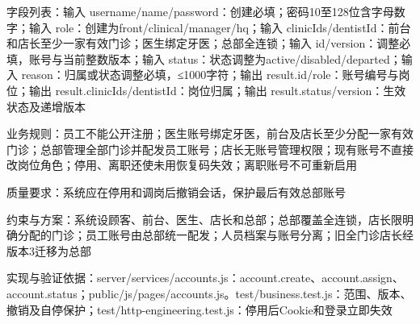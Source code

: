 \documentclass[UTF8,12pt,a4paper,fontset=none]{ctexart}
\begin{document}
字段列表：输入 username/\allowbreak{}name/\allowbreak{}password：创建必填；密码10至128位含字母数字；输入 role：创建为front/\allowbreak{}clinical/\allowbreak{}manager/\allowbreak{}hq；输入 clinicIds/\allowbreak{}dentistId：前台和店长至少一家有效门诊；医生绑定牙医；总部全连锁；输入 id/\allowbreak{}version：调整必填，账号与当前整数版本；输入 status：状态调整为active/\allowbreak{}disabled/\allowbreak{}departed；输入 reason：归属或状态调整必填，≤1000字符；输出 result.\allowbreak{}id/\allowbreak{}role：账号编号与岗位；输出 result.\allowbreak{}clinicIds/\allowbreak{}dentistId：岗位归属；输出 result.\allowbreak{}status/\allowbreak{}version：生效状态及递增版本\par
业务规则：员工不能公开注册；医生账号绑定牙医，前台及店长至少分配一家有效门诊；总部管理全部门诊并配发员工账号；店长无账号管理权限；现有账号不直接改岗位角色；停用、离职还使未用恢复码失效；离职账号不可重新启用\par
质量要求：系统应在停用和调岗后撤销会话，保护最后有效总部账号\par
约束与方案：系统设顾客、前台、医生、店长和总部；总部覆盖全连锁，店长限明确分配的门诊；员工账号由总部统一配发；人员档案与账号分离；旧全门诊店长经版本3迁移为总部\par
实现与验证依据：server/\allowbreak{}services/\allowbreak{}accounts.\allowbreak{}js：account.\allowbreak{}create、account.\allowbreak{}assign、account.\allowbreak{}status；public/\allowbreak{}js/\allowbreak{}pages/\allowbreak{}accounts.\allowbreak{}js。test/\allowbreak{}business.\allowbreak{}test.\allowbreak{}js：范围、版本、撤销及自停保护；test/\allowbreak{}http-engineering.\allowbreak{}test.\allowbreak{}js：停用后Cookie和登录立即失效\par
{}
\end{document}
